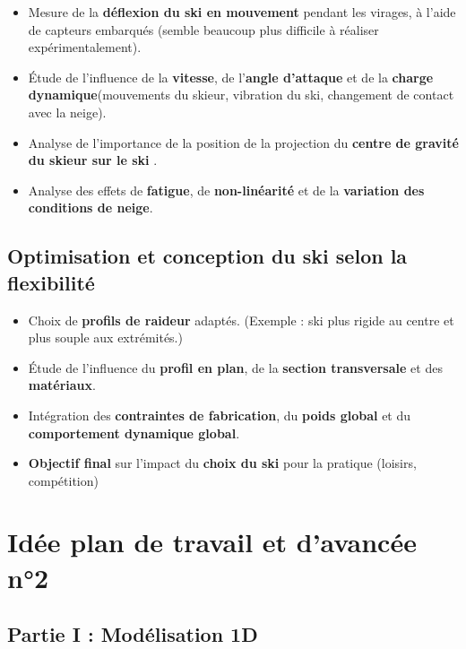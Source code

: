 \documentclass[12pt, a4paper]{article}
\begin{document}
\begin{itemize}
  \item Mesure de la \textbf{déflexion du ski en mouvement} pendant les virages, à l’aide de capteurs embarqués (semble beaucoup plus difficile à réaliser expérimentalement).
  \item Étude de l’influence de la \textbf{vitesse}, de l’\textbf{angle d’attaque} et de la \textbf{charge dynamique}(mouvements du skieur, vibration du ski, changement de contact avec la neige).
  \item Analyse de l'importance de la position de la projection du \textbf{centre de gravité du skieur sur le ski} .
  \item Analyse des effets de \textbf{fatigue}, de \textbf{non-linéarité} et de la \textbf{variation des conditions de neige}.
\end{itemize}

\subsection{Optimisation et conception du ski selon la flexibilité}

\begin{itemize}
  \item Choix de \textbf{profils de raideur} adaptés. (Exemple : ski plus rigide au centre et plus souple aux extrémités.)
  \item Étude de l’influence du \textbf{profil en plan}, de la \textbf{section transversale} et des \textbf{matériaux}.
  \item Intégration des \textbf{contraintes de fabrication}, du \textbf{poids global} et du \textbf{comportement dynamique global}.
  \item \textbf{Objectif final} sur l'impact du \textbf{choix du ski }pour la pratique (loisirs, compétition)
\end{itemize}

\section{Idée plan de travail et d'avancée n°2}

\subsection{Partie I : Modélisation 1D}
\end{document}
